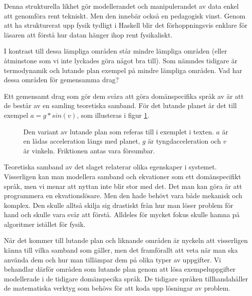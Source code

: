 \begin{binge}
Denna strukturella likhet gör modellerandet och manipulerandet av data enkel att genomföra rent tekniskt. Men den innebär också en pedagogisk vinst. Genom att ha strukturerat upp fysik tydligt i Haskell blir det förhoppningsvis enklare för läsaren att förstå hur datan hänger ihop rent fysikaliskt.

I kontrast till dessa lämpliga områden står mindre lämpliga områden (eller åtminstone som vi inte lyckades göra något bra till). Som nämndes tidigare är termodynamik och lutande plan exempel på mindre lämpliga områden. Vad har dessa områden för gemensamma drag?

Ett gemensamt drag som gör dem svåra att göra domänspecifika språk av är att de består av en samling teoretiska samband. För det lutande planet är det till exempel $a = g * sin(v)$, som illusteras i figur \ref{fig:lutande_plan}.

\begin{figure}[tph]
  \caption{Den variant av lutande plan som referas till i exemplet i texten. $a$ är en lådas acceleration längs med planet, $g$ är tyngdacceleration och $v$ är vinkeln. Friktionen antas vara försumbar.}
  \label{fig:lutande_plan}
\end{figure}

Teoretiska samband av det slaget relaterar olika egenskaper i systemet. Visserligen kan man modellera samband och ekvationer som ett domänspecifikt språk, men vi menar att nyttan inte blir stor med det. Det man kan göra är att programmera en ekvationslösare. Men den hade behövt vara både mekanisk och komplex. Den skulle alltså skilja sig drastiskt från hur man löser problem för hand och skulle vara svår att förstå. Alldeles för mycket fokus skulle hamna på algoritmer istället för fysik.

När det kommer till lutande plan och liknande områden är nyckeln att visserligen känna till vilka samband som gäller, men det framförallt att veta när man ska använda dem och hur man tillämpar dem på olika typer av uppgifter. Vi behandlar därför områden som lutande plan genom att lösa exempeluppgifter modellerade i de tidigare domänspecika språk. De tidigare språken tillhandahåller de matematiska verktyg som behövs för att koda upp lösningar av problem.



\end{binge}
